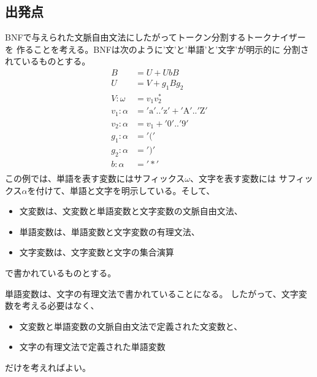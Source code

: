 {\subsection{出発点}\label{s2:出発点} %
	BNFで与えられた文脈自由文法にしたがってトークン分割するトークナイザーを
	作ることを考える。BNFは次のように'文'と'単語'と'文字'が明示的に
	分割されているものとする。
	\begin{equation}\label{eq:文法定義その一}\begin{split}
		B &= U + UbB \\
		U &= V + g_1 B g_2 \\
		V:\omega &= v_1 v_2^* \\
		v_1:\alpha &= '\text{a}' .. '\text{z}' + '\text{A}' .. '\text{Z}' \\
		v_2:\alpha &= v_1 + '\text{0}' .. '\text{9}' \\
		g_1:\alpha &= '(' \\
		g_2:\alpha &= ')' \\
		b:\alpha &= '*' \\
	\end{split}\end{equation}
	この例では、単語を表す変数にはサフィックス$\omega$、文字を表す変数には
	サフィックス$\alpha$を付けて、単語と文字を明示している。そして、
	\begin{itemize}\setlength{\itemsep}{-1mm} %
		\item 文変数は、文変数と単語変数と文字変数の文脈自由文法、
		\item 単語変数は、単語変数と文字変数の有理文法、
		\item 文字変数は、文字変数と文字の集合演算
	\end{itemize} %
	で書かれているものとする。
	
	単語変数は、文字の有理文法で書かれていることになる。
	したがって、文字変数を考える必要はなく、
	\begin{itemize}\setlength{\itemsep}{-1mm} %
		\item 文変数と単語変数の文脈自由文法で定義された文変数と、
		\item 文字の有理文法で定義された単語変数
	\end{itemize} %
	だけを考えればよい。

}
